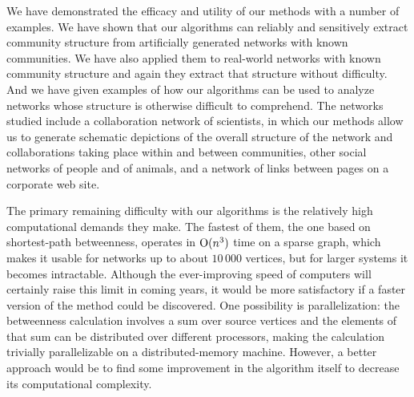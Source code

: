 \documentclass[twocolumn,pre,superscriptaddress]{revtex4}
\begin{document}
We have demonstrated the efficacy and utility of our methods with a number
of examples.  We have shown that our algorithms can reliably and
sensitively extract community structure from artificially generated
networks with known communities.  We have also applied them to real-world
networks with known community structure and again they extract that
structure without difficulty.  And we have given examples of how our
algorithms can be used to analyze networks whose structure is otherwise
difficult to comprehend.  The networks studied include a collaboration
network of scientists, in which our methods allow us to generate schematic
depictions of the overall structure of the network and collaborations
taking place within and between communities, other social networks of
people and of animals, and a network of links between pages on a corporate
web site.

The primary remaining difficulty with our algorithms is the relatively high
computational demands they make.  The fastest of them, the one based on
shortest-path betweenness, operates in $\mathrm{O}(n^3)$ time on a sparse graph,
which makes it usable for networks up to about $10\,000$ vertices, but for
larger systems it becomes intractable.  Although the ever-improving speed
of computers will certainly raise this limit in coming years, it would be
more satisfactory if a faster version of the method could be discovered.
One possibility is parallelization: the betweenness calculation involves a
sum over source vertices and the elements of that sum can be distributed
over different processors, making the calculation trivially parallelizable
on a distributed-memory machine.  However, a better approach would be to
find some improvement in the algorithm itself to decrease its computational
complexity.
\end{document}
